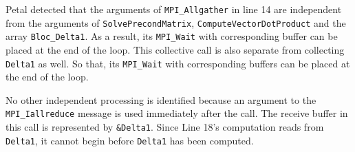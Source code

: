 Petal detected that the arguments of \texttt{MPI\_Allgather} in line 14 are independent from the arguments of \texttt{SolvePrecondMatrix}, \texttt{ComputeVectorDotProduct} and the array \texttt{Bloc\_Delta1}. As a result, its \texttt{MPI\_Wait} with corresponding buffer can be placed at the end of the loop.
This collective call is also separate from collecting \texttt{Delta1} as well.
So that, its \texttt{MPI\_Wait} with corresponding buffers can be placed at the end of the loop.

No other independent processing is identified because an argument to the \texttt{MPI\_Iallreduce} message is used immediately after the call. 
The receive buffer in this call is represented by \texttt{\&Delta1}. 
Since Line 18's computation reads from \texttt{Delta1}, it cannot begin before \texttt{Delta1} has been computed.





